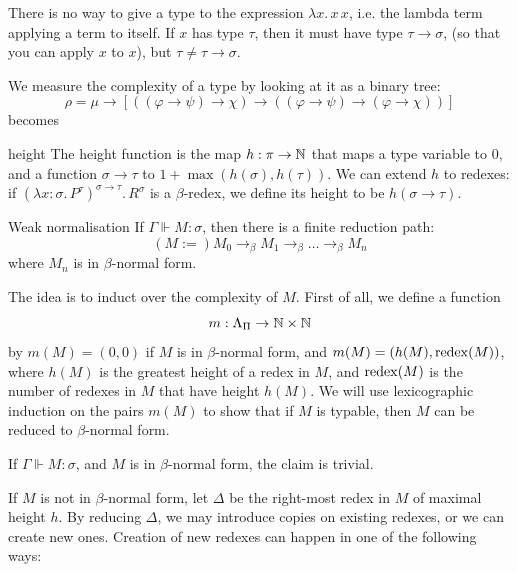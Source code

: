 \documentclass{article}
\numberwithin{thm}{subsection}
\begin{document}
\endproof
\begin{ex}
    There is no way to give a type to the expression $\lambda x. \, x \, x$, i.e. the lambda term applying a term to itself. If $x$ has type $\tau$, then it must have type $\tau \to \sigma$, (so that you can apply $x$ to $x$), but $\tau \neq \tau \to \sigma$.
\end{ex}
We measure the complexity of a type by looking at it as a binary tree: \[ \rho = \mu \to \left[\left( (\varphi \to \psi) \to \chi \right) \to \left( (\varphi \to \psi) \to (\varphi \to \chi) \right) \right] \] becomes \begin{center}
\end{center}
\begin{fancydefine}{height}
    The height function is the map $h: \pi \to \mathbb{N}$ that maps a type variable to $0$, and a function $\sigma \to \tau$ to $1+\max(h(\sigma),h(\tau))$. \gap We can extend $h$ to redexes: if $(\lambda x : \sigma. \, P^{\tau})^{\sigma \to \tau}. \, R^{\sigma}$ is a $\beta$-redex, we define its height to be $h(\sigma \to \tau)$.
\end{fancydefine}
\begin{fancythm}{Weak normalisation}
    If $\Gamma \Vdash M : \sigma$, then there is a finite reduction path: \[(M := )M_{0} \to_{\beta} M_{1} \to_{\beta} \dots \to_{\beta} M_{n}\] where $M_{n}$ is in $\beta$-normal form.
\end{fancythm}
\proof The idea is to induct over the complexity of $M$. \gap 
First of all, we define a function \[ m: \Lambda_{\Pi} \to \mathbb{N} \times \mathbb{N}\] by $m(M) = (0,0)$ if $M$ is in $\beta$-normal form, and $m(M) = (h(M),\operatorname{redex}(M))$, where $h(M)$ is the greatest height of a redex in $M$, and $\operatorname{redex}(M)$ is the number of redexes in $M$ that have height $h(M)$. \gap We will use lexicographic induction on the pairs $m(M)$ to show that if $M$ is typable, then $M$ can be reduced to $\beta$-normal form. \gap
\item If $\Gamma \Vdash M : \sigma$, and $M$ is in $\beta$-normal form, the claim is trivial.
\item If $M$ is not in $\beta$-normal form, let $\Delta$ be the right-most redex in $M$ of maximal height $h$. By reducing $\Delta$, we may introduce copies on existing redexes, or we can create new ones. Creation of new redexes can happen in one of the following ways: 
\end{document}

